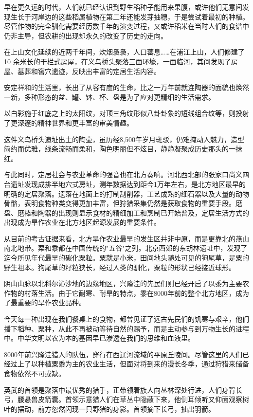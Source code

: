 早在更久远的时代，人们就已经认识到野生稻种子能用来果腹，或许他们无意间发现生长于河岸边的这些稻属植物在第二年还能发芽抽穗，于是尝试着最初的种植。尽管作物的完全驯化需要经历数千年的演变过程，又或许稻米在当时人们的食谱中仍非主导，但农耕的出现却永久的改变了历史的走向。

在上山文化延续的近两千年间，炊烟袅袅，人口蕃息……在浦江上山，人们修建了 10 余米长的干栏式房屋，在义乌桥头聚落三面环壕，一面临河，其间发现了房屋、墓葬和窖穴遗迹，反映出丰富的定居生活内容。

安定祥和的生活里，长出了从容有度的生命，比之一万年前就连陶器的面貌也焕然一新，多种形态的盆、罐、钵、杯、盘是为了应对更精细的生活需求。

以白彩施于红底之上的太阳纹，对顶三角纹形似八卦卦象的短线组合纹等，则投射了更深邃的精神世界和更丰富的审美情趣。

这件义乌桥头遗址出土的陶壶，虽历经8,500年岁月斑驳，仍难掩动人魅力，造型简约而优雅，线条流畅而柔和，陶色明丽但不炫目，静静凝聚成历史那头的一抹红。

与此同时，定居社会与农业革命的强音也在北方奏响。河北西北部的张家口尚义四台遗址发现成排半地穴式房址，测年数据达到距今1万年左右，是北方地区最早的明确的定居聚落。遗落在地面上的打制刮削器，工艺成熟的细石器以及大量的动物骨骼，表明食物种类变得更加丰富，但狩猎采集仍然是获取食物的重要手段。磨盘、磨棒和陶器的出现则显示食材的精细加工和烹制已开始普及，定居生活方式的出现成为旱作农业在北方地区起源发展的重要条件。

从目前的考古证据来看，北方旱作农业最早的发生区并非中原，而是更靠北的燕山南北地带。粟和黍都在中国传统的"五谷"之列。北京西郊的东胡林遗址中，发现了迄今所见年代最早的碳化粟粒。粟就是小米，田间地头随处可见的狗尾草，是粟的野生祖本。狗尾草的籽粒狭长，经过人类的驯化，粟粒的形状已经接近球形。

阴山山脉以北科尔沁沙地的边缘地区，兴隆洼的先民们则已经开启了以黍为主要农作物的村落生活。由于它耐寒、耐旱的特点，黍在8000年前的整个北方地区，成为了最重要的旱作农业品种。

今天每一种出现在我们餐桌上的食物，都曾见证了远古先民们的饥寒与艰辛，他们播下稻种、粟种，从此不再被动等待自然的赐予，而是主动参与到万物生长的进程中。中华文明以农为本的基因早已渗透在我们的思维和血液里。

8000年前兴隆洼猎人的队伍，穿行在西辽河流域的平原丘陵间。尽管这里的人们已经过上了以种植粟黍为主的农业生活，但面对将到来的漫长冬季，通过狩猎来储备食物依然不可或缺。

英武的首领是聚落中最优秀的猎手，正带领着族人向丛林深处行进，人们身背长弓，腰悬兽皮箭囊。首领示意猎人们在草丛中隐蔽下来，他侧耳倾听又仰面观察树叶的摆动，前方忽然闪现一只野猪的身影。首领摘下长弓，抽出羽箭。

